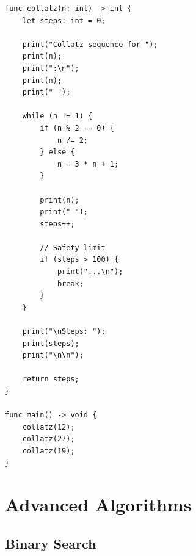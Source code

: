 \documentclass[12pt,a4paper,oneside]{book}
\begin{document}
\begin{lstlisting}[style=algo, caption={Collatz Sequence}]
func collatz(n: int) -> int {
    let steps: int = 0;
    
    print("Collatz sequence for ");
    print(n);
    print(":\n");
    print(n);
    print(" ");
    
    while (n != 1) {
        if (n % 2 == 0) {
            n /= 2;
        } else {
            n = 3 * n + 1;
        }
        
        print(n);
        print(" ");
        steps++;
        
        // Safety limit
        if (steps > 100) {
            print("...\n");
            break;
        }
    }
    
    print("\nSteps: ");
    print(steps);
    print("\n\n");
    
    return steps;
}

func main() -> void {
    collatz(12);
    collatz(27);
    collatz(19);
}
\end{lstlisting}

\chapter{Advanced Algorithms}

\section{Binary Search}
\end{document}
